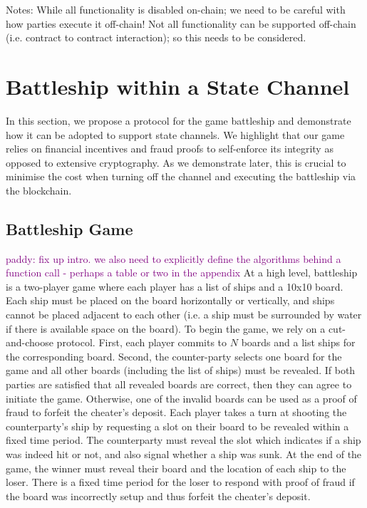 \documentclass{llncs}
\begin{document}
Notes: While all functionality is disabled on-chain; we need to be careful with how parties execute it off-chain! Not all functionality can be supported off-chain (i.e. contract to contract interaction); so this needs to be considered. 

\section{Battleship within a State Channel} 

In this section, we propose a protocol for the game battleship and demonstrate how it can be adopted to support state channels. 
We highlight that our game relies on financial incentives and fraud proofs to self-enforce its integrity as opposed to extensive cryptography.
As we demonstrate later, this is crucial to minimise the cost when turning off the channel and executing the battleship via the blockchain. 

\subsection{Battleship Game} 

\textcolor{purple}{paddy: fix up intro. we also need to explicitly define the algorithms behind a function call - perhaps a table or two in the appendix}
At a high level, battleship is a two-player game where each player has a list of ships and a 10x10 board. 
Each ship must be placed on the board horizontally or vertically, and ships cannot be placed adjacent to each other (i.e. a ship must be surrounded by water if there is available space on the board). 
To begin the game, we rely on a cut-and-choose protocol.
First, each player commits to $N$ boards and a list ships for the corresponding board. 
Second, the counter-party selects one board for the game and all other boards (including the list of ships) must be revealed. 
If both parties are satisfied that all revealed boards are correct, then they can agree to initiate the game. 
Otherwise, one of the invalid boards can be used as a proof of fraud to forfeit the cheater's deposit. 
Each player takes a turn at shooting the counterparty's ship by requesting a slot on their board to be revealed within a fixed time period. 
The counterparty must reveal the slot which indicates if a ship was indeed hit or not, and also signal whether a ship was sunk. 
At the end of the game, the winner must reveal their board and the location of each ship to the loser.
There is a fixed time period for the loser to respond with proof of fraud if the board was incorrectly setup and thus forfeit the cheater's deposit. 
\end{document}
